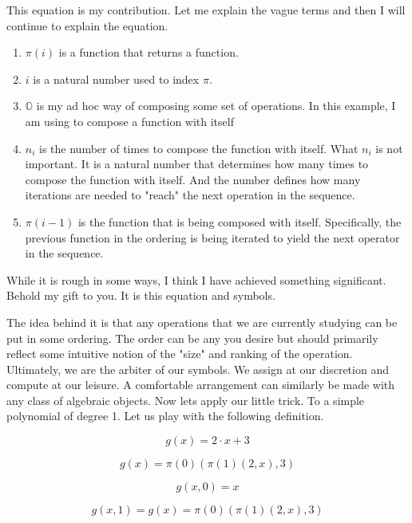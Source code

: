 \documentclass[12pt]{article}
\begin{document}
This equation is my contribution. Let me explain the vague terms and then I
will continue to explain the equation.

\begin{enumerate}
    \item $\pi(i)$ is a function that returns a function.
    \item $i$ is a natural number used to index $\pi$.
    \item $\mathbb{O}$ is my ad hoc way of composing some set of operations. In
          this example, I am using to compose a function with itself
    \item $n_i$ is the number of times to compose the function with itself. What
          $n_i$ is not important. It is a natural number that determines how many
          times to compose the function with itself. And the number defines how many
          iterations are needed to "reach" the next operation in the sequence.
    \item $\pi(i-1)$ is the function that is being composed with itself.
          Specifically, the previous function in the ordering is being iterated to
          yield the next operator in the sequence.
\end{enumerate}

While it is rough in some ways, I think I have achieved something significant.
Behold my gift to you. It is this equation and symbols.

The idea behind it is that any operations that we are currently studying can be
put in some ordering. The order can be any you desire but should primarily
reflect some intuitive notion of the "size" and ranking of the operation.
Ultimately, we are the arbiter of our symbols. We assign at our discretion and
compute at our leisure. A comfortable arrangement can similarly be made with
any class of algebraic objects. Now lets apply our little trick. To a simple
polynomial of degree 1. Let us play with the following definition.

\begin{equation}
    g(x) = 2 \cdot x + 3
\end{equation}

\begin{equation}
    g(x) = \pi(0)(\pi(1)(2,x), 3)
\end{equation}

\begin{equation}
    g(x,0) = x
\end{equation}

\begin{equation}
    g(x,1) = g(x) = \pi(0)(\pi(1)(2,x), 3)
\end{equation}
\end{document}
